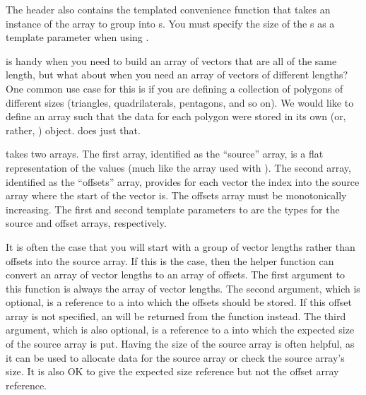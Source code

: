 
The  header also contains the
templated convenience function  that
takes an instance of the array to group into s. You
must specify the size of the s as a template parameter
when using .


 is handy when you need to build an array of vectors that are all of the same length, but what about when you need an array of vectors of different lengths?
One common use case for this is if you are defining a collection of polygons of different sizes (triangles, quadrilaterals, pentagons, and so on).
We would like to define an array such that the data for each polygon were stored in its own  (or, rather, \Veclike) object.
 does just that.

 takes two arrays. The first array, identified as the ``source'' array, is a flat representation of the values (much like the array used with ).
The second array, identified as the ``offsets'' array, provides for each vector the index into the source array where the start of the vector is.
The offsets array must be monotonically increasing.
The first and second template parameters to  are the types for the source and offset arrays, respectively.

It is often the case that you will start with a group of vector lengths rather than offsets into the source array.
If this is the case, then the  helper function can convert an array of vector lengths to an array of offsets.
The first argument to this function is always the array of vector lengths.
The second argument, which is optional, is a reference to a  into which the offsets should be stored.
If this offset array is not specified, an  will be returned from the function instead.
The third argument, which is also optional, is a reference to a  into which the expected size of the source array is put.
Having the size of the source array is often helpful, as it can be used to allocate data for the source array or check the source array's size.
It is also OK to give the expected size reference but not the offset array reference.

